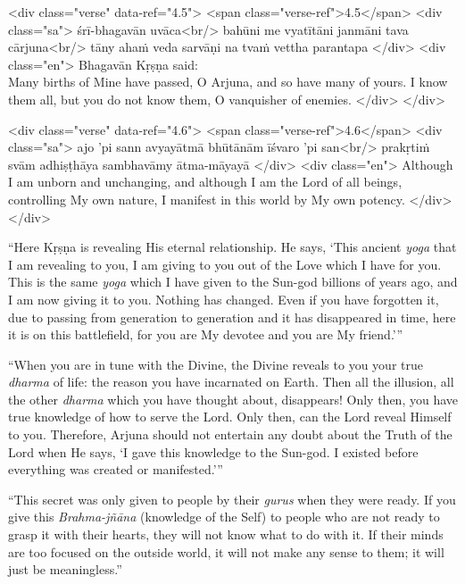 \begin{html}
<div class="verse" data-ref="4.5">
  <span class="verse-ref">4.5</span>
  <div class="sa">
    śrī-bhagavān uvāca<br/>
    bahūni me vyatītāni janmāni tava cārjuna<br/>
    tāny ahaṁ veda sarvāṇi na tvaṁ vettha parantapa
  </div>
  <div class="en">
    \hspace*{1em}Bhagavān Kṛṣṇa said: \\ Many births of Mine have passed, O Arjuna, and so have many of yours. I know them all, but you do not know them, O vanquisher of enemies.
  </div>
</div>
\end{html}



\begin{html}
<div class="verse" data-ref="4.6">
  <span class="verse-ref">4.6</span>
  <div class="sa">
    ajo ’pi sann avyayātmā bhūtānām īśvaro ’pi san<br/>
    prakṛtiṁ svām adhiṣṭhāya sambhavāmy ātma-māyayā
  </div>
  <div class="en">
    Although I am unborn and unchanging, and although I am the Lord of all beings, controlling My own nature, I manifest in this world by My own potency.
  </div>
</div>
\end{html}


\enquote{Here Kṛṣṇa is revealing His eternal relationship. He says, \enquote{This ancient \textit{yoga} that I am revealing to you, I am giving to you out of the Love which I have for you. This is the same \textit{yoga} which I have given to the Sun-god billions of years ago, and I am now giving it to you. Nothing has changed. Even if you have forgotten it, due to passing from generation to generation and it has disappeared in time, here it is on this battlefield, for you are My devotee and you are My friend.}}

\enquote{When you are in tune with the Divine, the Divine reveals to you your true \textit{dharma} of life: the reason you have incarnated on Earth. Then all the illusion, all the other \textit{dharma} which you have thought about, disappears! Only then, you have true knowledge of how to serve the Lord. Only then, can the Lord reveal Himself to you. Therefore, Arjuna should not entertain any doubt about the Truth of the Lord when He says, \enquote{I gave this knowledge to the Sun-god. I existed before everything was created or manifested.}}

\enquote{This secret was only given to people by their \textit{gurus} when they were ready. If you give this \textit{Brahma-jñāna} (knowledge of the Self) to people who are not ready to grasp it with their hearts, they will not know what to do with it. If their minds are too focused on the outside world, it will not make any sense to them; it will just be meaningless.}

